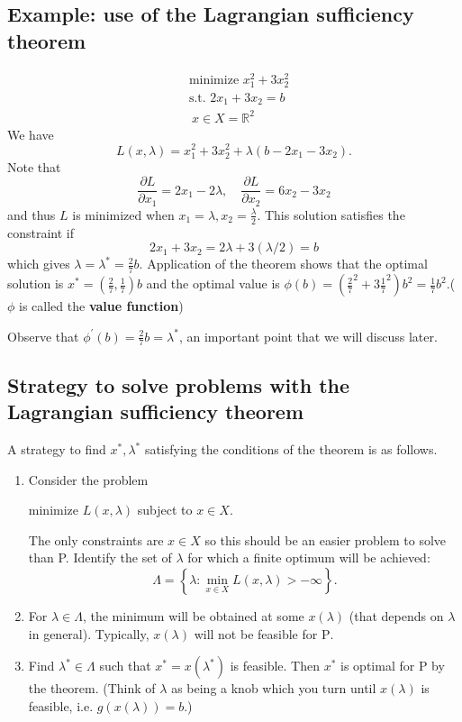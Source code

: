 \subsection{Example: use of the Lagrangian sufficiency theorem}
\begin{example}
    \[
        \begin{aligned}
            &\text{minimize } x_1^2+3 x_2^2 \\
            &\text {s.t. } 2 x_1+3 x_2=b \\
            &\ x \in X=\mathbb{R}^2
            \end{aligned}
    \]
    We have 
    \[
        L(x, \lambda)=x_1^2+3 x_2^2+\lambda\left(b-2 x_1-3 x_2\right).
    \]
    Note that 
    \[
        \frac{\partial L}{\partial x_1} = 2x_1-2\lambda,\quad \frac{\partial L}{\partial x_2} = 6x_2 - 3x_2  
    \]
    and thus $L$ is minimized when $ x_1=\lambda,x_2=\frac{\lambda}{2} $. This solution satisfies the constraint if
    \[
    2 x_1+3 x_2=2 \lambda+3(\lambda / 2)=b
    \]
    which gives $\lambda=\lambda^*=\frac{2}{7}b$. Application of the theorem shows that the optimal solution is $x^*=(\frac{2}{7},\frac{1}{7}) b$ and the optimal value is $\phi(b)=\left(\frac{2}{7}^2+3\frac{1}{7}^2\right) b^2=\frac{1}{7} b^2$.($ \phi $ is called the \textbf{value function}) 
    
    Observe that $\phi^{\prime}(b)=\frac{2}{7} b=\lambda^*$, an important point that we will discuss later.
\end{example}

\subsection{Strategy to solve problems with the Lagrangian sufficiency theorem}
A strategy to find $x^*, \lambda^*$ satisfying the conditions of the theorem is as follows.
\begin{enumerate}
    \item Consider the problem
    \begin{center}
        minimize $L(x, \lambda)$ subject to $x \in X$.
    \end{center}
    The only constraints are $x \in X$ so this should be an easier problem to solve than P. Identify the set of $\lambda$ for which a finite optimum will be achieved:
    \[
    \Lambda=\left\{\lambda: \min _{x \in X} L(x, \lambda)>-\infty\right\} .
    \]
    \item For $\lambda \in \Lambda$, the minimum will be obtained at some $x(\lambda)$ (that depends on $\lambda$ in general). Typically, $x(\lambda)$ will not be feasible for $\mathrm{P}$.
    \item Find $\lambda^* \in \Lambda$ such that $x^*=x\left(\lambda^*\right)$ is feasible. Then $x^*$ is optimal for $\mathrm{P}$ by the theorem. (Think of $\lambda$ as being a knob which you turn until $x(\lambda)$ is feasible, i.e. $ g(x(\lambda))=b $.)
\end{enumerate}

